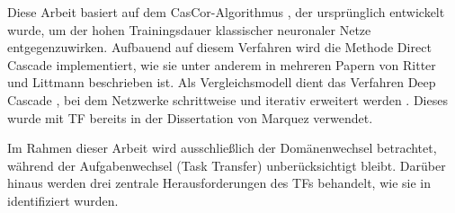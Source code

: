 Diese Arbeit basiert auf dem CasCor-Algorithmus \cite{cascor}, der ursprünglich entwickelt wurde, um der hohen 
Trainingsdauer klassischer neuronaler Netze entgegenzuwirken. Aufbauend auf diesem Verfahren wird die Methode Direct Cascade implementiert, 
wie sie unter anderem in mehreren Papern von Ritter und Littmann \cite{cascade_llm_networks,cascade_network_architectures} beschrieben ist. 
Als Vergleichsmodell dient das Verfahren Deep Cascade \cite{deep_cascade_learning}, bei dem 
Netzwerke schrittweise und iterativ erweitert werden \cite{Constructive_Cascade}. Dieses wurde mit TF bereits in der Dissertation 
von Marquez \cite{phd_deep_cascade} verwendet. 

Im Rahmen dieser Arbeit wird ausschließlich der Domänenwechsel betrachtet, während der Aufgabenwechsel (Task Transfer) \cite{transfer_learning} 
unberücksichtigt bleibt. Darüber hinaus werden drei zentrale Herausforderungen des TFs behandelt, wie sie in \cite{survey_transfer} 
identifiziert wurden.
\newline
